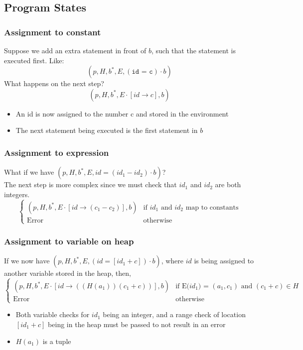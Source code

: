 \documentclass[10pt]{article}
\begin{document}
\subsection*{Program States}
\subsubsection*{Assignment to constant}
Suppose we add an extra statement in front of $b$, such that the statement is executed first.  Like:
\[(p, H, b^*, E, (\texttt{id = c}) \cdot b)\]
What happens on the next step?
\[(p, H, b^*, E \cdot [id \rightarrow c], b)\]
\begin{itemize}
    \item An id is now assigned to the number c and stored in the environment
    \item The next statement being executed is the first statement in $b$
\end{itemize}
\subsubsection*{Assignment to expression}
What if we have $(p, H, b^*, E, id = (id_1 - id_2) \cdot b)$?\\
The next step is more complex since we must check that $id_1$ and $id_2$ are both integers.
\[\begin{cases} (p, H, b^*, E \cdot [id \rightarrow (c_1 - c_2)], b) & \text{if $id_1$ and $id_2$ map to constants} \\ \text{Error} & \text{otherwise} \end{cases}\]
\subsubsection*{Assignment to variable on heap}
If we now have $(p, H, b^*, E, (id = [id_1 + c]) \cdot b)$, where $id$ is being assigned to another variable stored in the heap, then,
\[\begin{cases} (p, H, b^*, E \cdot [id \rightarrow ((H(a_1))(c_1 + c))], b) & \text{if E($id_1$) = $(a_1, c_1)$ and $(c_1 + c) \in H$} \\ \text{Error} & \text{otherwise}\end{cases}\]
\begin{itemize}
    \item Both variable checks for $id_1$ being an integer, and a range check of location $[id_1 + c]$ being in the heap must be passed to not result in an error
    \item $H(a_1)$ is a tuple
\end{itemize}
\end{document}
